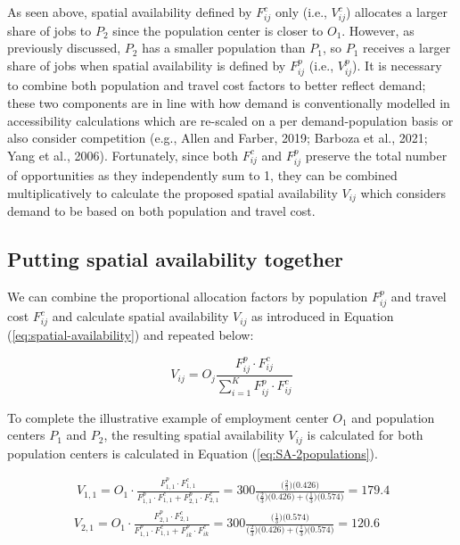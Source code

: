\documentclass[]{elsarticle} %
\begin{document}
As seen above, spatial availability defined by \(F^c_{ij}\) only (i.e.,
\(V^c_{ij}\)) allocates a larger share of jobs to \(P_2\) since the
population center is closer to \(O_1\). However, as previously
discussed, \(P_2\) has a smaller population than \(P_1\), so \(P_1\)
receives a larger share of jobs when spatial availability is defined by
\(F^p_{ij}\) (i.e., \(V^p_{ij}\)). It is necessary to combine both
population and travel cost factors to better reflect demand; these two
components are in line with how demand is conventionally modelled in
accessibility calculations which are re-scaled on a per
demand-population basis or also consider competition (e.g., Allen and
Farber, 2019; Barboza et al., 2021; Yang et al., 2006). Fortunately,
since both \(F^c_{ij}\) and \(F^p_{ij}\) preserve the total number of
opportunities as they independently sum to 1, they can be combined
multiplicatively to calculate the proposed spatial availability
\(V_{ij}\) which considers demand to be based on both population and
travel cost.

\hypertarget{putting-spatial-availability-together}{%
\subsection{Putting spatial availability
together}\label{putting-spatial-availability-together}}

We can combine the proportional allocation factors by population
\(F^p_{ij}\) and travel cost \(F^c_{ij}\) and calculate spatial
availability \(V_{ij}\) as introduced in Equation
(\ref{eq:spatial-availability}) and repeated below:

\[
V_{ij} = O_j\frac{F^p_{ij} \cdot F^c_{ij}}{\sum_{i=1}^K F^p_{ij} \cdot F^c_{ij}}
\]

To complete the illustrative example of employment center \(O_1\) and
population centers \(P_1\) and \(P_2\), the resulting spatial
availability \(V_{ij}\) is calculated for both population centers is
calculated in Equation (\ref{eq:SA-2populations}).

\begin{equation}
\label{eq:SA-2populations}
\begin{array}{l}\
V_{1,1} = O_1\cdot \frac{F^p_{1,1} \cdot F^c_{1,1}}{F^p_{1,1} \cdot F^c_{1,1} + F^p_{2,1} \cdot F^c_{2,1}} = 300 \frac{\big(\frac{2}{3} \big) \big(0.426 \big)}{\big(\frac{2}{3} \big) \big(0.426 \big) + \big(\frac{1}{3} \big) \big(0.574 \big)} = 179.4\\
V_{2,1} = O_1\cdot \frac{F^p_{2,1} \cdot F^c_{2,1}}{F^p_{1,1} \cdot F^c_{1,1} + F^p_{ik} \cdot F^c_{ik}} = 300 \frac{\big(\frac{1}{3} \big) \big(0.574 \big)}{\big(\frac{2}{3} \big) \big(0.426 \big) + \big(\frac{1}{3} \big) \big(0.574 \big)}  =  120.6 \\
\end{array}
\end{equation}
\end{document}
